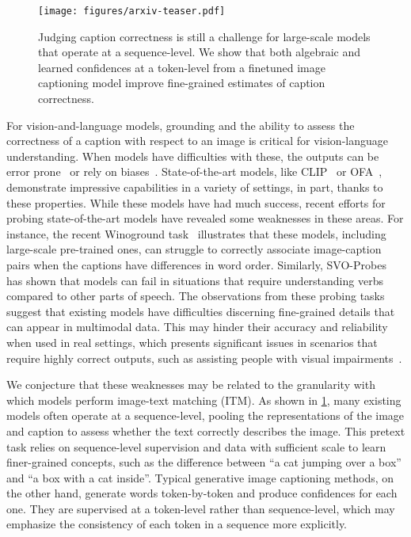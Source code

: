 \documentclass[10pt,twocolumn,letterpaper]{article}
\begin{document}
\begin{figure}[t]
  \centering
   \texttt{[image: figures/arxiv-teaser.pdf]}
   \caption{Judging caption correctness is still a challenge for large-scale models that operate at a sequence-level. We show that both algebraic and learned confidences at a token-level from a finetuned image captioning model improve fine-grained estimates of caption correctness.
   }
   \label{fig:teaser}
\end{figure} 

For vision-and-language models, grounding and the ability to assess the correctness of a caption with respect to an image is critical for vision-language understanding.
When models have difficulties with these, the outputs can be error prone~\cite{rohrbach2018emnlp} or rely on biases~\cite{agrawal2018vqacp,hendricks2018women}.
State-of-the-art models, like CLIP~\cite{radford2021learning} or OFA~\cite{wang2022unifying}, demonstrate impressive capabilities in a variety of settings, in part, thanks to these properties.
While these models have had much success, recent efforts for probing state-of-the-art models have revealed some weaknesses in these areas.
For instance, the recent Winoground task~\cite{thrush_and_ross2022winoground} illustrates that these models, including large-scale pre-trained ones, can struggle to correctly associate image-caption pairs when the captions have differences in word order.
Similarly, SVO-Probes~\cite{hendricks2021probing} has shown that models can fail in situations that require understanding verbs compared to other parts of speech.
The observations from these probing tasks suggest that existing models have difficulties discerning fine-grained details that can appear in multimodal data.
This may hinder their accuracy and reliability when used in real settings, which presents significant issues in scenarios that require highly correct outputs, such as assisting people with visual impairments~\cite{gurari2018vizwiz,whitehead2022reliable}.


We conjecture that these weaknesses may be related to the granularity with which models perform image-text matching (ITM).
As shown in \cref{fig:teaser}, many existing models often operate at a sequence-level, pooling the representations of the image and caption to assess whether the text correctly describes the image.
This pretext task relies on sequence-level supervision and data with sufficient scale to learn finer-grained concepts, such as the difference between ``a cat jumping over a box'' and ``a box with a cat inside''.
Typical generative image captioning methods, on the other hand, generate words token-by-token and produce confidences for each one.
They are supervised at a token-level rather than sequence-level, which may emphasize the consistency of each token in a sequence more explicitly.
\end{document}
